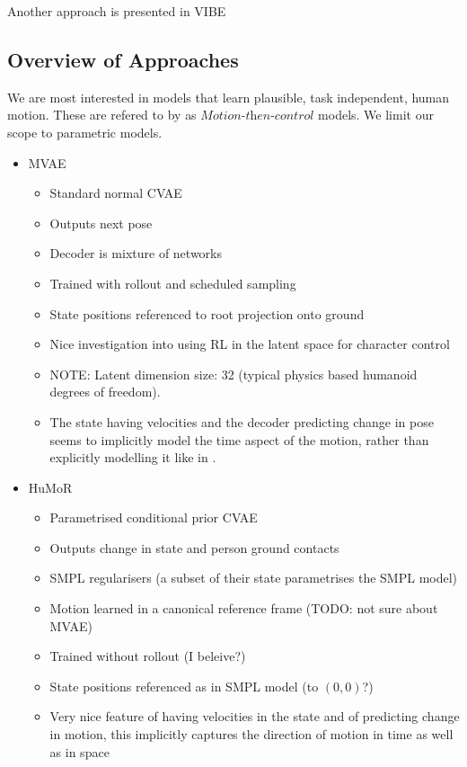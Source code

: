 Another approach is presented in VIBE 



\subsection{Overview of Approaches}
We are most interested in models that learn plausible, task independent, human motion. These are refered to by \cite{MVAE} as $\textit{Motion-then-control}$ models. We limit our scope to parametric models.
\begin{itemize}
    \item MVAE \cite{humor}
    \begin{itemize}
        \item Standard normal CVAE
        \item Outputs next pose
        \item Decoder is mixture of networks
        \item Trained with rollout and scheduled sampling
        \item State positions referenced to root projection onto ground
        \item Nice investigation into using RL in the latent space for character control
        \item NOTE: Latent dimension size: 32 (typical physics based humanoid degrees of freedom).
        \item The state having velocities and the decoder predicting change in pose seems to implicitly model the time aspect of the motion, rather than explicitly modelling it like in \cite{structured4Dlatentspace}.
    \end{itemize}
    \item HuMoR \cite{humor}
    \begin{itemize}
        \item Parametrised conditional prior CVAE
        \item Outputs change in state and person ground contacts
        \item SMPL regularisers (a subset of their state parametrises the SMPL model)
        \item Motion learned in a canonical reference frame (TODO: not sure about MVAE)
        \item Trained without rollout (I beleive?) 
        \item State positions referenced as in SMPL model (to $(0,0)$?)
        \item Very nice feature of having velocities in the state and of predicting change in motion, this implicitly captures the direction of motion in time as well as in space 

\end{itemize}
\end{itemize}
